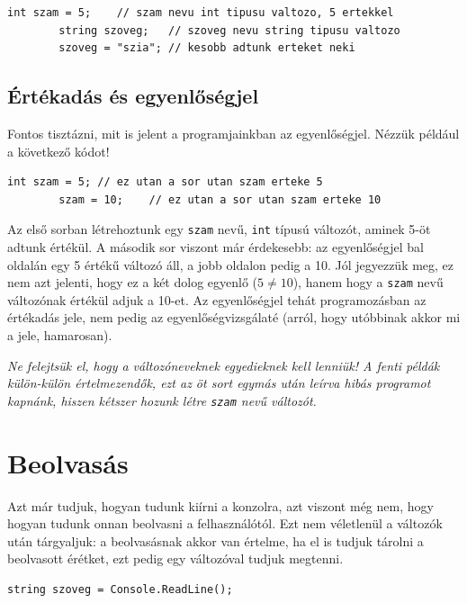 \documentclass[a4paper]{article}
\begin{document}
	\begin{lstlisting}[caption=Változók, label=lst:variables]
		int szam = 5;    // szam nevu int tipusu valtozo, 5 ertekkel
		string szoveg;   // szoveg nevu string tipusu valtozo
		szoveg = "szia"; // kesobb adtunk erteket neki
	\end{lstlisting}
	
	\subsection{Értékadás és egyenlőségjel}
	Fontos tisztázni, mit is jelent a programjainkban az egyenlőségjel. Nézzük például a következő kódot!
	
	\begin{lstlisting}[caption=Értékadás, label=lst:assignment]
		int szam = 5; // ez utan a sor utan szam erteke 5
		szam = 10;    // ez utan a sor utan szam erteke 10
	\end{lstlisting}
	
	Az első sorban létrehoztunk egy \lstinline{szam} nevű, \lstinline{int} típusú változót, aminek 5-öt adtunk értékül. A második sor viszont már érdekesebb: az egyenlőségjel bal oldalán egy 5 értékű változó áll, a jobb oldalon pedig a 10. Jól jegyezzük meg, ez nem azt jelenti, hogy ez a két dolog egyenlő ($5 \neq 10$), hanem hogy a \lstinline{szam} nevű változónak értékül adjuk a 10-et. Az egyenlőségjel tehát programozásban az értékadás jele, nem pedig az egyenlőségvizsgálaté (arról, hogy utóbbinak akkor mi a jele, hamarosan).
	
	\emph{Ne felejtsük el, hogy a változóneveknek egyedieknek kell lenniük! A fenti példák külön-külön értelmezendők, ezt az öt sort egymás után leírva hibás programot kapnánk, hiszen kétszer hozunk létre \lstinline{szam} nevű változót.}
	
	\section{Beolvasás}
	Azt már tudjuk, hogyan tudunk kiírni a konzolra, azt viszont még nem, hogy hogyan tudunk onnan beolvasni a felhasználótól. Ezt nem véletlenül a változók után tárgyaljuk: a beolvasásnak akkor van értelme, ha el is tudjuk tárolni a beolvasott érétket, ezt pedig egy változóval tudjuk megtenni.
	
	\begin{lstlisting}[caption=Beolvasás, label=lst:read]
		string szoveg = Console.ReadLine();
	\end{lstlisting}
	
\end{document}
